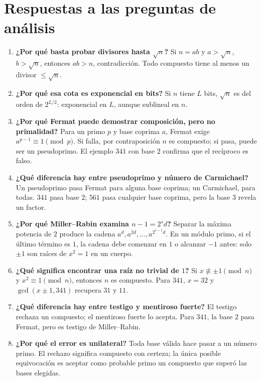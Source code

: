 \section{Respuestas a las preguntas de análisis}
\begin{enumerate}
\setlength{\itemsep}{.2em}
\item \textbf{¿Por qué basta probar divisores hasta $\sqrt n$?} Si $n=ab$ y $a>\sqrt n$, $b>\sqrt n$, entonces $ab>n$, contradicción. Todo compuesto tiene al menos un divisor $\le\sqrt n$.

\item \textbf{¿Por qué esa cota es exponencial en bits?} Si $n$ tiene $L$ bits, $\sqrt n$ es del orden de $2^{L/2}$: exponencial en $L$, aunque sublineal en $n$.

\item \textbf{¿Por qué Fermat puede demostrar composición, pero no primalidad?} Para un primo $p$ y base coprima $a$, Fermat exige $a^{p-1}\equiv1\pmod p$. Si falla, por contraposición $n$ es compuesto; si pasa, puede ser un pseudoprimo. El ejemplo $341$ con base $2$ confirma que el recíproco es falso.

\item \textbf{¿Qué diferencia hay entre pseudoprimo y número de Carmichael?} Un pseudoprimo pasa Fermat para alguna base coprima; un Carmichael, para todas. $341$ pasa base $2$; $561$ pasa cualquier base coprima, pero la base $3$ revela un factor.

\item \textbf{¿Por qué Miller--Rabin examina $n-1=2^sd$?} Separar la máxima potencia de $2$ produce la cadena $a^d,a^{2d},\ldots,a^{2^{s-1}d}$. En un módulo primo, si el último término es $1$, la cadena debe comenzar en $1$ o alcanzar $-1$ antes: solo $\pm1$ son raíces de $x^2=1$ en un cuerpo.

\item \textbf{¿Qué significa encontrar una raíz no trivial de $1$?} Si $x\not\equiv\pm1\pmod n$ y $x^2\equiv1\pmod n$, entonces $n$ es compuesto. Para $341$, $x=32$ y $\gcd(x\pm1,341)$ recupera $31$ y $11$.

\pagebreak[4]
\item \textbf{¿Qué diferencia hay entre testigo y mentiroso fuerte?} El testigo rechaza un compuesto; el mentiroso fuerte lo acepta. Para $341$, la base $2$ pasa Fermat, pero es testigo de Miller--Rabin.

\item \textbf{¿Por qué el error es unilateral?} Toda base válida hace pasar a un número primo. El rechazo significa compuesto con certeza; la única posible equivocación es aceptar como probable primo un compuesto que superó las bases elegidas.


\end{enumerate}
